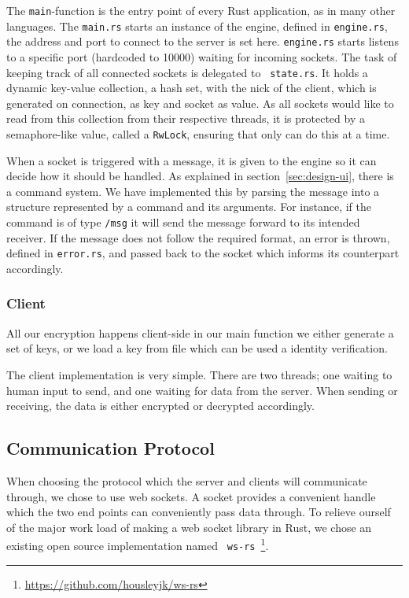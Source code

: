 The {\tt main}-function is the entry point of every Rust application,
as in many other languages. The {\tt main.rs} starts an instance of
the engine, defined in {\tt engine.rs}, the address and port to
connect to the server is set here. {\tt engine.rs} starts listens to a
specific port (hardcoded to 10000) waiting for incoming sockets. The
task of keeping track of all connected sockets is delegated to {\tt
  state.rs}. It holds a dynamic key-value collection, a hash set, with
the nick of the client, which is generated on connection, as key and
socket as value. As all sockets would like to read from this
collection from their respective threads, it is protected by a
semaphore-like value, called a {\tt RwLock}, ensuring that only can do
this at a time.

When a socket is triggered with a message, it is given to the engine
so it can decide how it should be handled. As explained in
section~\ref{sec:design-ui}, there is a command system. We have
implemented this by parsing the message into a structure represented
by a command and its arguments. For instance, if the command is of
type {\tt /msg} it will send the message forward to its intended
receiver. If the message does not follow the required format, an error
is thrown, defined in {\tt error.rs}, and passed back to the socket
which informs its counterpart accordingly.

\subsubsection{Client}
All our encryption happens client-side in our main function we either generate
a set of keys, or we load a key from file which can be used a identity
verification.

The client implementation is very simple. There are two threads; one
waiting to human input to send, and one waiting for data from the
server. When sending or receiving, the data is either encrypted or
decrypted accordingly.


\subsection{Communication Protocol}
When choosing the protocol which the server and clients will
communicate through, we chose to use web sockets. A socket provides a
convenient handle which the two end points can conveniently pass data
through. To relieve ourself of the major work load of making a web
socket library in Rust, we chose an existing open source
implementation named {\tt
  ws-rs}~\footnote{\url{https://github.com/housleyjk/ws-rs}}.

